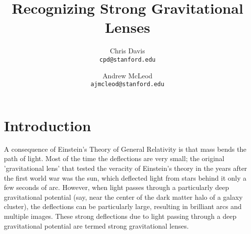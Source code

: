 \documentclass[10pt,twocolumn,letterpaper]{article}
\begin{document}
\title{Recognizing Strong Gravitational Lenses}

\author{Chris Davis\\
{\tt\small cpd@stanford.edu}
\and
Andrew McLeod\\
{\tt\small ajmcleod@stanford.edu}
}

\maketitle


\section{Introduction}

A consequence of Einstein's Theory of General Relativity is that mass bends the
path of light. Most of the time the deflections are very small; the original
'gravitational lens' that tested the veracity of Einstein's theory in the years
after the first world war was the sun, which deflected light from stars behind
it only a few seconds of arc. However, when light passes through a particularly
deep gravitational potential (say, near the center of the dark matter halo of a
galaxy cluster), the deflections can be particularly large, resulting in
brilliant arcs and multiple images. These strong deflections due to light
passing through a deep gravitational potential are termed strong gravitational
lenses.
\end{document}
